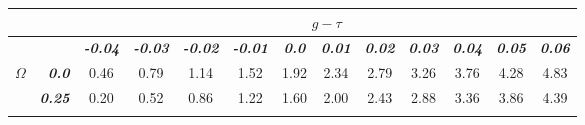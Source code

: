 \documentclass[]{article}
\begin{document}
\begin{table}[h]
\setlength{\tabcolsep}{3pt}
\begin{tabular}{lrccccccccccc}
\hline
                                                         & \multicolumn{1}{l}{}  & \multicolumn{11}{c}{\large{\textbf{$g-\tau$}}}                                                                                                                                                                                                                                                                                                                                                                                                                                                            \\ \hline
\multicolumn{1}{l}{}                                    & \multicolumn{1}{l}{}  & \multicolumn{1}{c}{\textit{\textbf{-0.04}}} & \multicolumn{1}{c}{\textit{\textbf{-0.03}}} & \multicolumn{1}{c}{\textit{\textbf{-0.02}}} & \multicolumn{1}{c}{\textit{\textbf{-0.01}}} & \multicolumn{1}{c}{\textit{\textbf{0.0}}} & \multicolumn{1}{c}{\textit{\textbf{0.01}}} & \multicolumn{1}{c}{\textit{\textbf{0.02}}} & \multicolumn{1}{c}{\textit{\textbf{0.03}}} & \multicolumn{1}{c}{\textit{\textbf{0.04}}} & \multicolumn{1}{c}{\textit{\textbf{0.05}}} & \textit{\textbf{0.06}} \\ \hline
\multicolumn{1}{l}{\multirow{5}{*}{\large{\textbf{$\Omega$}}}} & \textit{\textbf{0.0}}  & \multicolumn{1}{c}{0.46}                    & \multicolumn{1}{c}{0.79}                    & \multicolumn{1}{c}{1.14}                    & \multicolumn{1}{c}{1.52}                    & \multicolumn{1}{c}{1.92}                & \multicolumn{1}{c}{2.34}                   & \multicolumn{1}{c}{2.79}                   & \multicolumn{1}{c}{3.26}                   & \multicolumn{1}{c}{3.76}                   & \multicolumn{1}{c}{4.28}                   & 4.83                   \\ \cline{2-13}
\multicolumn{1}{l}{}                                   & \textit{\textbf{0.25}} & \multicolumn{1}{c}{0.20}                    & \multicolumn{1}{c}{0.52}                    & \multicolumn{1}{c}{0.86}                    & \multicolumn{1}{c}{1.22}                    & \multicolumn{1}{c}{1.60}                & \multicolumn{1}{c}{2.00}                   & \multicolumn{1}{c}{2.43}                   & \multicolumn{1}{c}{2.88}                   & \multicolumn{1}{c}{3.36}                   & \multicolumn{1}{c}{3.86}                   & 4.39                   \\ \cline{2-13}

\end{tabular}
\end{table}
\end{document}
